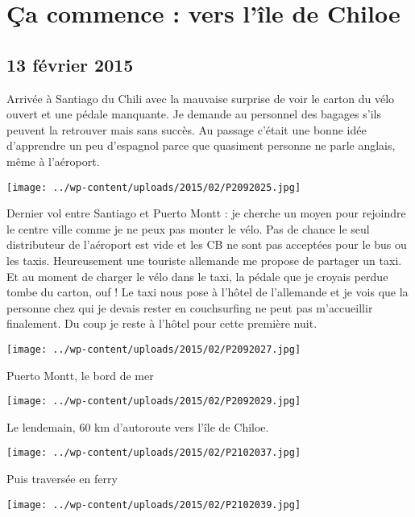 \chapter{Ça commence : vers l’île de Chiloe}
\section*{13 février 2015}
Arrivée à Santiago du Chili avec la mauvaise surprise de voir le carton du vélo ouvert et une pédale manquante. Je demande au personnel des bagages s'ils peuvent la retrouver mais sans succès. \newline
 Au passage c'était une bonne idée d'apprendre un peu d'espagnol parce que quasiment personne ne parle anglais, même à l'aéroport. \newline
 \newline
\centerline{\texttt{[image: ../wp-content/uploads/2015/02/P2092025.jpg]} } 
 \newline
 Dernier vol entre Santiago et Puerto Montt : je cherche un moyen pour rejoindre le centre ville comme je ne peux pas monter le vélo. \newline
 Pas de chance le seul distributeur de l'aéroport est vide et les CB ne sont pas acceptées pour le bus ou les taxis. \newline
 Heureusement une touriste allemande me propose de partager un taxi. Et au moment de charger le vélo dans le taxi, la pédale que je croyais perdue tombe du carton, ouf ! \newline
 Le taxi nous pose à l'hôtel de l'allemande et je vois que la personne chez qui je devais rester en couchsurfing ne peut pas m'accueillir finalement. Du coup je reste à l'hôtel pour cette première nuit. \newline
 \newline
\centerline{\texttt{[image: ../wp-content/uploads/2015/02/P2092027.jpg]} } 
 Puerto Montt, le bord de mer \newline
\centerline{\texttt{[image: ../wp-content/uploads/2015/02/P2092029.jpg]} } 
 Le lendemain, 60 km d'autoroute vers l'île de Chiloe. \newline
 \newline
\centerline{\texttt{[image: ../wp-content/uploads/2015/02/P2102037.jpg]} } 
 \newline
 Puis traversée en ferry \newline
 \newline
\centerline{\texttt{[image: ../wp-content/uploads/2015/02/P2102039.jpg]} } 
